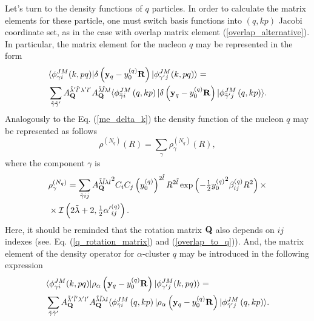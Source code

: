 \documentclass[
12pt, %
oneside, %
english, %
onehalfspacing, %
onehalfspacing, %
headsepline, %
]{MastersDoctoralThesis} %
\begin{document}
Let's turn to the density functions of $q$ particles.
 In order to calculate the matrix elements for these particle, one must switch basis functions into $(q,kp)$ Jacobi coordinate set, as in the case with overlap matrix element (\ref{overlap_alternative}). 
In particular, the matrix element for the nucleon $q$ may be represented in the form
\begin{align}
&\langle \phi^{JM}_{\gamma i} (k,pq) \vert 
\delta \left( {\bf y}_q-y^{(q)}_0 {\bf R} \right)
\vert \phi^{JM}_{\gamma' j} (k,pq) \rangle = 
\\
&\sum_{\tilde{\gamma} \tilde{\gamma}'}
A^{\tilde{\lambda}' \tilde{l}' \lambda' l'}_{{\bf Q} }
A^{\tilde{\lambda} \tilde{l} \lambda l}_{{\bf Q} }
\langle \phi^{ J M}_{\tilde{\gamma} i}\left(q,kp \right) \vert 
\delta \left( {\bf y}_q-y^{(q)}_0 {\bf R} \right) \vert
\phi^{ J M}_{\tilde{\gamma}^{\prime} j}\left(q,kp \right) \rangle.
\nonumber
\end{align}
Analogously to the  Eq. (\ref{me_delta_k}) the density function of the nucleon $q$ may be represented as follows
\begin{equation}
\label{rho_nq}
\rho^{(N_q)}(R)=\sum_{\gamma} \rho_\gamma^{(N_q)} (R),
\end{equation}
where the component $\gamma$ is
\begin{align}
&\rho_\gamma^{(N_q)}=
\sum_{\tilde{\gamma}ij} 
{A^{\tilde{\lambda} \tilde{l} \lambda l}_{{\bf Q} }}^2
C_iC_j  
\left( y_0^{(q)} \right)^{2\tilde{l}}
R^{2\tilde{l}} 
\exp \left( -\tfrac{1}{2} {y_0^{(q)}}^2 \beta^{(q)}_{ij} R^2 \right) \times 
\\ \nonumber 
& \times
\mathcal{I}\left( 2\tilde{\lambda}+2, \tfrac{1}{2} {\alpha'}_{ij}^{(q)} \right).
\end{align}
Here, it should be reminded that the rotation matrix ${\bf Q}$ also depends on $ij$ indexes (see. Eq. (\ref{q_rotation_matrix}) and (\ref{overlap_to_q})).
And, the matrix element of the density operator for $\alpha$-cluster $q$ may be introduced in the following expression
\begin{align}
&\langle \phi^{JM}_{\gamma i} (k,pq) \vert 
\rho_\alpha \left( {\bf y}_q-y^{(q)}_0 {\bf R} \right)
\vert \phi^{JM}_{\gamma' j} (k,pq) \rangle = 
\\
&\sum_{\tilde{\gamma} \tilde{\gamma}'}
A^{\tilde{\lambda}' \tilde{l}' \lambda' l'}_{{\bf Q} }
A^{\tilde{\lambda} \tilde{l} \lambda l}_{{\bf Q} }
\langle \phi^{ J M}_{\tilde{\gamma} i}\left(q,kp \right) \vert 
\rho_\alpha \left( {\bf y}_q-y^{(q)}_0 {\bf R} \right) \vert
\phi^{ J M}_{\tilde{\gamma}^{\prime} j}\left(q,kp \right) \rangle.
\nonumber
\end{align}
\end{document}
